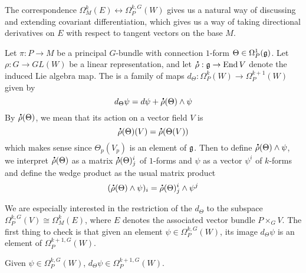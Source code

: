 The correspondence $\Omega^k_M(E) \leftrightarrow \Omega^{k,G}_P(W)$ gives
us a natural way of discussing and extending covariant differentiation, which
gives us a way of taking directional derivatives on $E$ with respect to tangent
vectors on the base $M$.
\begin{defn}
Let $\pi : P \to M$ be a principal $G$-bundle with connection $1$-form
$\Theta \in \Omega_P^1(\mathfrak{g})$. Let $\rho : G \to GL(W)$ be a linear representation,
and let $\accentset{\mbox{\large\bfseries .}}{\rho} : \mathfrak{g} \to \operatorname{End} V$ denote the induced Lie algebra map. The
 is a family of maps
$d_\Theta : \Omega_P^k(W) \to \Omega_P^{k+1}(W)$ given by
\[
d_\Theta \psi = d\psi + \accentset{\mbox{\large\bfseries .}}{\rho}(\Theta) \wedge \psi
\]
By $\accentset{\mbox{\large\bfseries .}}{\rho}(\Theta)$, we mean that its action on a vector field $V$ is
\[
\accentset{\mbox{\large\bfseries .}}{\rho}(\Theta)(V) = \accentset{\mbox{\large\bfseries .}}{\rho}(\Theta(V))
\]
which makes sense since $\Theta_p(V_p)$ is an element of $\mathfrak{g}$. Then
to define $\accentset{\mbox{\large\bfseries .}}{\rho}(\Theta) \wedge \psi$, we interpret $\accentset{\mbox{\large\bfseries .}}{\rho}(\Theta)$
as a matrix $\accentset{\mbox{\large\bfseries .}}{\rho}(\Theta)^i_j$ of $1$-forms and $\psi$ as a vector
$\psi^i$ of $k$-forms and define the wedge product as the usual matrix product
\[
(\accentset{\mbox{\large\bfseries .}}{\rho}(\Theta) \wedge \psi)_i = \accentset{\mbox{\large\bfseries .}}{\rho}(\Theta)^i_j \wedge \psi^j
\]
\end{defn}
%
We are especially interested in the restriction of the $d_\Theta$
to the subspace $\Omega_P^{k,G}(V) \cong \Omega_M^k(E)$, where $E$ denotes
the associated vector bundle $P \times_G V$. The first thing to check
is that given an element $\psi \in \Omega_P^{k,G}(W)$, its image
$d_\Theta\psi$ is an element of $\Omega_P^{k+1,G}(W)$.
%
\begin{prop}
Given $\psi \in \Omega_P^{k,G}(W)$, $d_\Theta\psi \in \Omega_P^{k+1,G}(W)$.
\end{prop}
%
